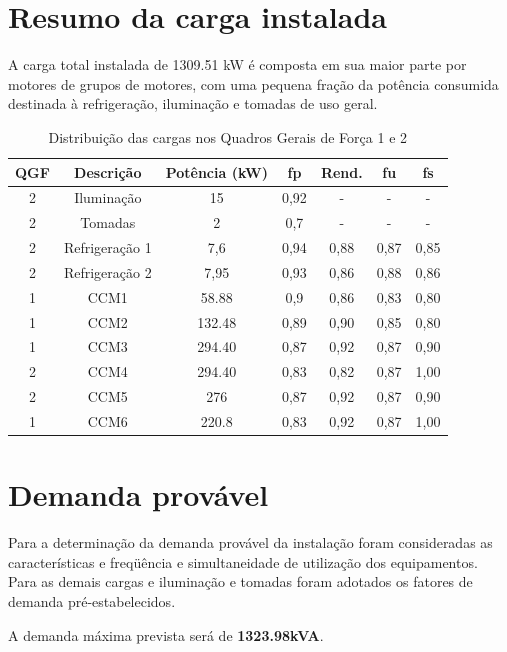 \section{Resumo da carga instalada}

A carga total instalada de 1309.51 kW é composta em sua maior parte por motores de grupos de motores, com uma pequena fração da potência consumida destinada à refrigeração, iluminação e tomadas de uso geral. 
	
\begin{table}[htbp]
  \centering

    \begin{tabular}{ccccccc}
    \toprule
    \textbf{QGF} & \textbf{Descrição} & \textbf{Potência (kW)} & \textbf{fp} & \textbf{Rend.} & \textbf{fu} &\textbf{fs} \\
    \midrule
    2     & Iluminação & 15  & 0,92   &   -    & - & -\\ 
    2     & Tomadas & 2   & 0,7   &    -   & - & -\\
    2     & Refrigeração 1 & 7,6   & 0,94  & 0,88   & 0,87 & 0,85\\
    2     & Refrigeração 2 & 7,95   & 0,93  & 0,86   & 0,88 & 0,86\\
    1     & CCM1 & 58.88  & 0,9   & 0,86   & 0,83 & 0,80\\
    1     & CCM2 & 132.48 & 0,89  & 0,90   & 0,85 & 0,80\\
    1     & CCM3 & 294.40 & 0,87  & 0,92   & 0,87 & 0,90\\
    2     & CCM4 & 294.40 & 0,83  & 0,82   & 0,87 & 1,00\\
    2     & CCM5 & 276    & 0,87  & 0,92   & 0,87 & 0,90\\
    1     & CCM6 & 220.8  & 0,83  & 0,92   & 0,87 & 1,00\\
    \bottomrule
    \end{tabular}%
  \caption{Distribuição das cargas nos Quadros Gerais de Força 1 e 2}
\end{table}%


\section{Demanda provável}
Para a determinação da demanda provável da instalação foram consideradas as
características e freqüência e simultaneidade de utilização dos equipamentos.\\
Para as demais cargas e iluminação e tomadas foram adotados
os fatores de demanda pré-estabelecidos.

A demanda máxima prevista será de \textbf{1323.98kVA}.